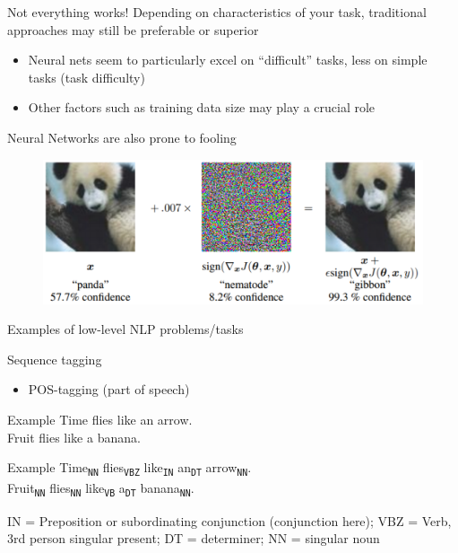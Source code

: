 \documentclass[12pt]{beamer}
\newcommand*\POS[1]{\textsubscript{\texttt{#1}}} %
\begin{document}
\begin{frame}{Not everything works!}
Depending on characteristics of your task, traditional approaches may still be preferable or superior

\begin{itemize}
	\item Neural nets seem to particularly excel on “difficult” tasks, less on simple tasks (task difficulty)
	\item Other factors such as training data size may play a crucial role	
\end{itemize}

Neural Networks are also prone to fooling

\begin{figure}
\includegraphics[width=0.6\linewidth]{img/screenshot_2021-03-24_15-12-45.png}
\end{figure}

\end{frame}


\begin{frame}{Examples of low-level NLP problems/tasks}

Sequence tagging

\begin{itemize}
	\item POS-tagging (part of speech)
\end{itemize}


	
\begin{exampleblock}{Example}
	Time flies   like   an   arrow.\\Fruit   flies   like   a   banana.
\end{exampleblock}

\bigskip

\begin{exampleblock}{Example}
		Time\POS{NN} flies\POS{VBZ}  like\POS{IN}   an\POS{DT}   arrow\POS{NN}.		\\ Fruit\POS{NN}   flies\POS{NN}   like\POS{VB}   a\POS{DT}   banana\POS{NN}.
\end{exampleblock}

\begin{footnotesize}
IN = Preposition or subordinating conjunction (conjunction here); VBZ = Verb, 3rd person singular present; DT = determiner; NN = singular noun
\end{footnotesize}

\end{frame}
\end{document}
